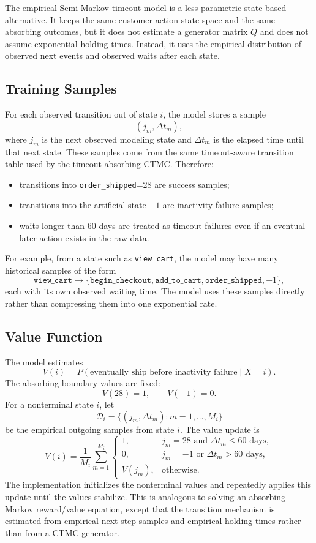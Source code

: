 \documentclass[11pt]{article}
\begin{document}
The empirical Semi-Markov timeout model is a less parametric state-based
alternative. It keeps the same customer-action state space and the same
absorbing outcomes, but it does not estimate a generator matrix $Q$ and does
not assume exponential holding times. Instead, it uses the empirical
distribution of observed next events and observed waits after each state.

\subsection{Training Samples}

For each observed transition out of state $i$, the model stores a sample
\[
    (j_m, \Delta t_m),
\]
where $j_m$ is the next observed modeling state and $\Delta t_m$ is the elapsed
time until that next state. These samples come from the same timeout-aware
transition table used by the timeout-absorbing CTMC. Therefore:

\begin{itemize}
    \item transitions into \texttt{order\_shipped}=28 are success samples;
    \item transitions into the artificial state $-1$ are inactivity-failure
          samples;
    \item waits longer than 60 days are treated as timeout failures even if an
          eventual later action exists in the raw data.
\end{itemize}

For example, from a state such as \texttt{view\_cart}, the model may have many
historical samples of the form
\[
    \texttt{view\_cart}
    \rightarrow
    \{\texttt{begin\_checkout}, \texttt{add\_to\_cart},
    \texttt{order\_shipped}, -1\},
\]
each with its own observed waiting time. The model uses these samples directly
rather than compressing them into one exponential rate.

\subsection{Value Function}

The model estimates
\[
    V(i) = P(\text{eventually ship before inactivity failure}\mid X=i).
\]
The absorbing boundary values are fixed:
\[
    V(28)=1,
    \qquad
    V(-1)=0.
\]
For a nonterminal state $i$, let
\[
    \mathcal{D}_i = \{(j_m,\Delta t_m): m=1,\ldots,M_i\}
\]
be the empirical outgoing samples from state $i$. The value update is
\[
    V(i) =
    \frac{1}{M_i}\sum_{m=1}^{M_i}
    \begin{cases}
        1, & j_m=28 \text{ and } \Delta t_m \leq 60\text{ days}, \\
        0, & j_m=-1 \text{ or } \Delta t_m > 60\text{ days}, \\
        V(j_m), & \text{otherwise.}
    \end{cases}
\]
The implementation initializes the nonterminal values and repeatedly applies
this update until the values stabilize. This is analogous to solving an
absorbing Markov reward/value equation, except that the transition mechanism is
estimated from empirical next-step samples and empirical holding times rather
than from a CTMC generator.
\end{document}
